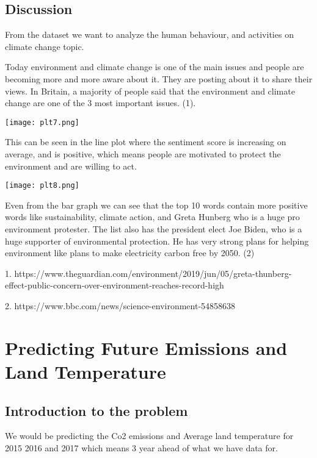\documentclass[a4paper, 11pt]{report}
\begin{document}
\subsection{Discussion}

From the dataset we want to analyze the human behaviour, and activities on climate change topic.

Today environment and climate change is one of the main issues and people are becoming more and more aware about it. They are posting about it to share their views. In Britain, a majority  of people said that the environment and climate change are one of the 3 most important issues. (1).

\begin{multicols}{2}
  \texttt{[image: plt7.png]}

  This can be seen in the line plot where the sentiment score is increasing on average, and is positive, which means people are motivated to protect the environment and are willing to act.
\end{multicols}






  \texttt{[image: plt8.png]}


    Even from the bar graph we can see that the top 10 words contain more positive words like sustainability, climate action, and Greta Hunberg who is a huge pro environment protester. The list also has the president elect Joe Biden, who is a huge supporter of environmental protection. He has very strong plans for helping environment like plans to make electricity carbon free by 2050. (2)

\scriptsize
1. https://www.theguardian.com/environment/2019/jun/05/greta-thunberg-effect-public-concern-over-environment-reaches-record-high

2. https://www.bbc.com/news/science-environment-54858638
\normalsize
\newpage
\section{Predicting Future Emissions and Land Temperature}

\subsection{Introduction to the problem}

We would be predicting the Co2 emissions and Average land temperature for 2015 2016 and 2017 which means 3 year ahead of what we have data for. \\
\end{document}
